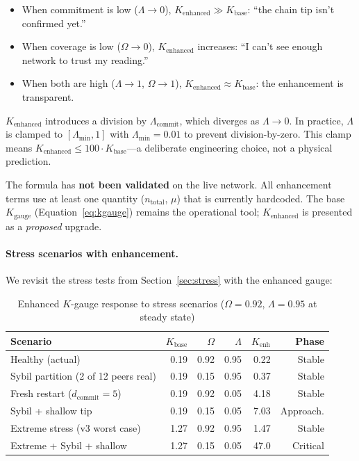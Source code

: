 \documentclass[11pt,a4paper]{article}
\begin{document}
\begin{itemize}[nosep]
    \item When commitment is low ($\Lambda \to 0$), $K_{\text{enhanced}} \gg K_{\text{base}}$: ``the chain tip isn't confirmed yet.''
    \item When coverage is low ($\Omega \to 0$), $K_{\text{enhanced}}$ increases: ``I can't see enough network to trust my reading.''
    \item When both are high ($\Lambda \to 1$, $\Omega \to 1$), $K_{\text{enhanced}} \approx K_{\text{base}}$: the enhancement is transparent.
\end{itemize}

\begin{honesty}
$K_{\text{enhanced}}$ introduces a division by $\Lambda_{\text{commit}}$, which diverges as $\Lambda \to 0$. In practice, $\Lambda$ is clamped to $[\Lambda_{\min}, 1]$ with $\Lambda_{\min} = 0.01$ to prevent division-by-zero. This clamp means $K_{\text{enhanced}} \leq 100 \cdot K_{\text{base}}$---a deliberate engineering choice, not a physical prediction.

The formula has \textbf{not been validated} on the live network. All enhancement terms use at least one quantity ($n_{\text{total}}$, $\mu$) that is currently hardcoded. The base $K_{\text{gauge}}$ (Equation~\ref{eq:kgauge}) remains the operational tool; $K_{\text{enhanced}}$ is presented as a \emph{proposed} upgrade.
\end{honesty}

\paragraph{Stress scenarios with enhancement.} We revisit the stress tests from Section~\ref{sec:stress} with the enhanced gauge:

\begin{table}[H]
\centering
\caption{Enhanced $K$-gauge response to stress scenarios ($\Omega = 0.92$, $\Lambda = 0.95$ at steady state)}
\label{tab:kenhanced}
\small
\begin{tabular}{@{}p{4.5cm}rrrrr@{}}
\toprule
\textbf{Scenario} & $K_{\text{base}}$ & $\Omega$ & $\Lambda$ & $K_{\text{enh}}$ & \textbf{Phase} \\
\midrule
Healthy (actual) & 0.19 & 0.92 & 0.95 & 0.22 & Stable \\
Sybil partition (2 of 12 peers real) & 0.19 & 0.15 & 0.95 & 0.37 & Stable \\
Fresh restart ($d_{\text{commit}} = 5$) & 0.19 & 0.92 & 0.05 & 4.18 & Stable \\
Sybil + shallow tip & 0.19 & 0.15 & 0.05 & 7.03 & Approach. \\
Extreme stress (v3 worst case) & 1.27 & 0.92 & 0.95 & 1.47 & Stable \\
Extreme + Sybil + shallow & 1.27 & 0.15 & 0.05 & 47.0 & Critical \\
\bottomrule
\end{tabular}
\end{table}
\end{document}
